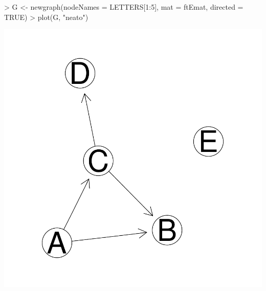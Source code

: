 \documentclass[12pt,oneside,titlepage,letter]{article}
\begin{document}
\begin{center}
\begin{Schunk}
\begin{Sinput}
> G <- newgraph(nodeNames = LETTERS[1:5], mat = ftEmat, directed = TRUE)
> plot(G, "neato")
\end{Sinput}
\end{Schunk}
\includegraphics{sweave_p-034}
\end{center}
\end{document}
